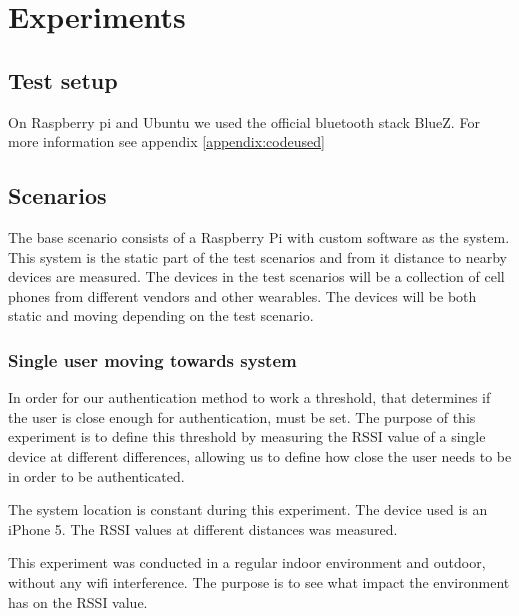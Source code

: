 \section{Experiments}

\subsection{Test setup}

On Raspberry pi and Ubuntu we used the official bluetooth stack BlueZ.
For more information see appendix \ref{appendix:codeused}

\subsection{Scenarios}

The base scenario consists of a Raspberry Pi with custom software as the system.
This system is the static part of the test scenarios and from it distance to nearby devices are measured.
The devices in the test scenarios will be a collection of cell phones from different vendors and other wearables.
The devices will be both static and moving depending on the test scenario.



\subsubsection{Single user moving towards system}
\label{section:MovingTowardsSystem}
In order for our authentication method to work a threshold, that determines if the user is close enough for authentication, must be set. The purpose of this experiment is to define this threshold by measuring the RSSI value of a single device at different differences, allowing us to define how close the user needs to be in order to be authenticated. 

The system location is constant during this experiment. The device used is an iPhone 5. The RSSI values at different distances was measured. 

This experiment was conducted in a regular indoor environment and outdoor, without any wifi interference. The purpose is to see what impact the environment has on the RSSI value.


